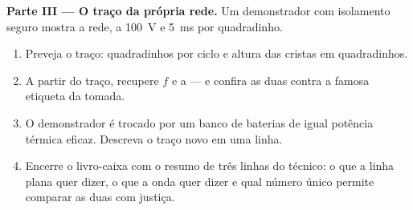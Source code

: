 \begin{problem}
\medskip\noindent\textbf{Parte III --- O traço da própria rede.}
Um demonstrador com isolamento seguro mostra a rede, a \qty{100}{V} e
\qty{5}{ms} por quadradinho.
\begin{enumerate}[resume]
  \item Preveja o traço: quadradinhos por ciclo e altura das cristas
        em quadradinhos.
  \item A partir do traço, recupere $f$ e a  --- e
        confira as duas contra a famosa etiqueta da tomada.
  \item O demonstrador é trocado por um banco de baterias de igual
        potência térmica eficaz. Descreva o traço novo em uma linha.
  \item Encerre o livro-caixa com o resumo de três linhas do técnico:
        o que a linha plana quer dizer, o que a onda quer dizer e
        qual número único permite comparar as duas com justiça.
\end{enumerate}
\end{problem}
